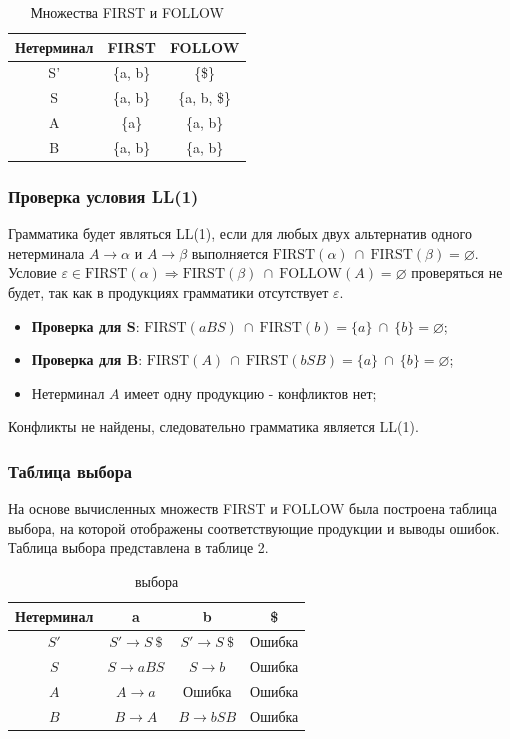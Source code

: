 \documentclass[a4paper,final]{article}
\begin{document}
\begin{table}[H]
    \centering
    \caption{\centering Множества FIRST и FOLLOW}
    \begin{tabular}{|c|c|c|}\hline
        Нетерминал & FIRST & FOLLOW\\\hline
        S' & \{a, b\} & \{\$\}\\
        S & \{a, b\} & \{a, b, \$\}\\
        A & \{a\} & \{a, b\}\\
        B & \{a, b\} & \{a, b\}\\\hline
    \end{tabular}
\end{table}

\subsubsection{Проверка условия LL(1)}
Грамматика будет являться LL(1), если для любых двух альтернатив одного нетерминала $A \rightarrow \alpha$ и $A \rightarrow \beta$ выполняется $\text{FIRST}(\alpha) ~\cap~ \text{FIRST}(\beta) = \varnothing$. Условие $\varepsilon \in \text{FIRST}(\alpha) \Rightarrow \text{FIRST}(\beta) ~\cap~ \text{FOLLOW}(A) = \varnothing$ проверяться не будет, так как в продукциях грамматики отсутствует $\varepsilon$.

\begin{itemize}
    \item \textbf{Проверка для S}: $\text{FIRST}(aBS) ~\cap~ \text{FIRST}(b) = \{a\} ~\cap~ \{b\} = \varnothing$;
    \item \textbf{Проверка для B}: $\text{FIRST}(A) ~\cap~ \text{FIRST}(bSB) = \{a\} ~\cap~ \{b\} = \varnothing$;
    \item Нетерминал $A$ имеет одну продукцию - конфликтов нет;
\end{itemize}

Конфликты не найдены, следовательно грамматика является LL(1).

\subsubsection{Таблица выбора}

На основе вычисленных множеств FIRST и FOLLOW была построена таблица выбора, на которой отображены соответствующие продукции и выводы ошибок. Таблица выбора представлена в таблице 2.


\begin{table}[H]
    \centering
    \caption{ выбора}
    \begin{tabular}{|c|c|c|c|}\hline
        Нетерминал & a & b & \$\\\hline
        $S'$ & $S' \rightarrow S~\$$ & $S' \rightarrow S~\$$ & Ошибка\\
        $S$ & $S \rightarrow aBS$ & $S \rightarrow b$ & Ошибка\\
        $A$ & $A \rightarrow a$ & Ошибка & Ошибка\\
        $B$ & $B \rightarrow A$ & $B \rightarrow bSB$ & Ошибка\\\hline
    \end{tabular}
\end{table}
\end{document}
